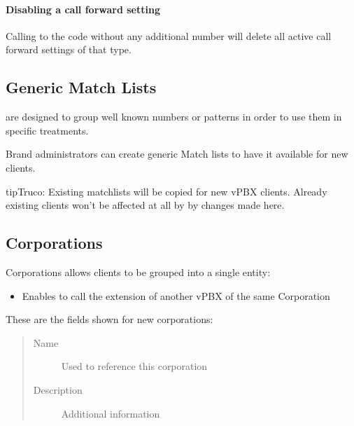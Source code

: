 \documentclass[letterpaper,10pt,spanish]{sphinxmanual}
\begin{document}
\paragraph{Disabling a call forward setting}

Calling to the code without any additional number will delete all active call forward settings of that type.


\subsection{Generic Match Lists}
\label{administration_portal/brand/settings/generic_match_lists:generic-match-lists}\label{administration_portal/brand/settings/generic_match_lists::doc}\label{administration_portal/brand/settings/generic_match_lists:brand-match-lists}
{\hyperref[administration_portal/client/vpbx/routing_tools/match_lists:id1]{}} are designed to group well known numbers or patterns in order to use them in specific treatments.

Brand administrators can create generic Match lists to have it available for new clients.

\begin{notice}{tip}{Truco:}
Existing matchlists will be copied for new vPBX clients. Already existing clients won't be affected at all by
by changes made here.
\end{notice}


\subsection{Corporations}
\label{administration_portal/brand/settings/corporations:corporations}\label{administration_portal/brand/settings/corporations::doc}\label{administration_portal/brand/settings/corporations:id1}
Corporations allows clients to be grouped into a single entity:
\begin{itemize}
\item {} 
Enables {\hyperref[administration_portal/client/vpbx/routing_endpoints/friends/internal_friends:internal\string-friends]{}} to call the extension of another vPBX of the same Corporation

\end{itemize}

These are the fields shown for new corporations:
\begin{quote}
\begin{description}
\item[{Name}] \leavevmode
Used to reference this corporation

\item[{Description}] \leavevmode
Additional information

\end{description}
\end{quote}
\end{document}
